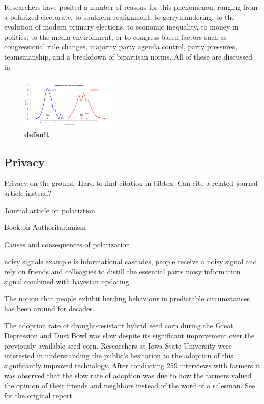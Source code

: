 Researchers have posited a number of reasons for this phenomenon, ranging from a polarized electorate, to southern realignment, to gerrymandering, to the evolution of modern primary elections, to economic inequality, to money in politics, to the media environment, or to congress-based factors such as congressional rule changes, majority party agenda control, party pressures, teamsmanship, and a breakdown of bipartisan norms.  All of these are discussed in  \cite{poole1984polarization}

\begin{figure}[htbp]
\begin{center}
\includegraphics[width=0.4\textwidth]{figs/alpha_House_114_Histogram_8_January_2016}
\caption{{\bf default}}
\label{default}
\end{center}
\end{figure}



\subsection{Privacy}

Privacy on the ground. Hard to find citation in bibtex. Can cite a related journal article instead?

Journal article on polariztion \cite{poole1984polarization}

Book on Authoritarianism \cite{hetherington2009authoritarianism}


Causes and consequences of polarization \cite{barber2015causes}

noisy signals example is informational cascades, people receive a noisy signal and rely on friends and colleagues to distill the essential parts
noisy information signal combined with bayesian updating. 



The notion that people exhibit herding behaviour in predictable circumstances has been around for decades. \cite{shiller1995conversation}

The adoption rate of drought-resistant hybrid seed corn during the Great Depression and Dust Bowl was slow despite its significant improvement over the previously available seed corn. Researchers at Iowa State University were interested in understanding the public's hesitation to the adoption of this significantly improved technology. After conducting 259 interviews with farmers \cite{carboneau2005using} it was observed that the slow rate of adoption was due to how the farmers valued the opinion of their friends and neighbors instead of the word of a salesman. See \cite{beal1957diffusion} for the original report.


